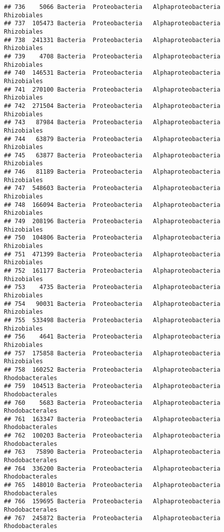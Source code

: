 \documentclass[
]{article}
\begin{document}
\begin{verbatim}
## 736    5066 Bacteria  Proteobacteria   Alphaproteobacteria         Rhizobiales
## 737  105473 Bacteria  Proteobacteria   Alphaproteobacteria         Rhizobiales
## 738  241331 Bacteria  Proteobacteria   Alphaproteobacteria         Rhizobiales
## 739    4708 Bacteria  Proteobacteria   Alphaproteobacteria         Rhizobiales
## 740  146531 Bacteria  Proteobacteria   Alphaproteobacteria         Rhizobiales
## 741  270100 Bacteria  Proteobacteria   Alphaproteobacteria         Rhizobiales
## 742  271504 Bacteria  Proteobacteria   Alphaproteobacteria         Rhizobiales
## 743   87984 Bacteria  Proteobacteria   Alphaproteobacteria         Rhizobiales
## 744   63879 Bacteria  Proteobacteria   Alphaproteobacteria         Rhizobiales
## 745   63877 Bacteria  Proteobacteria   Alphaproteobacteria         Rhizobiales
## 746   81189 Bacteria  Proteobacteria   Alphaproteobacteria         Rhizobiales
## 747  548603 Bacteria  Proteobacteria   Alphaproteobacteria         Rhizobiales
## 748  166094 Bacteria  Proteobacteria   Alphaproteobacteria         Rhizobiales
## 749  208196 Bacteria  Proteobacteria   Alphaproteobacteria         Rhizobiales
## 750  104806 Bacteria  Proteobacteria   Alphaproteobacteria         Rhizobiales
## 751  471399 Bacteria  Proteobacteria   Alphaproteobacteria         Rhizobiales
## 752  161177 Bacteria  Proteobacteria   Alphaproteobacteria         Rhizobiales
## 753    4735 Bacteria  Proteobacteria   Alphaproteobacteria         Rhizobiales
## 754   90031 Bacteria  Proteobacteria   Alphaproteobacteria         Rhizobiales
## 755  533498 Bacteria  Proteobacteria   Alphaproteobacteria         Rhizobiales
## 756    4641 Bacteria  Proteobacteria   Alphaproteobacteria         Rhizobiales
## 757  175858 Bacteria  Proteobacteria   Alphaproteobacteria         Rhizobiales
## 758  160252 Bacteria  Proteobacteria   Alphaproteobacteria     Rhodobacterales
## 759  104513 Bacteria  Proteobacteria   Alphaproteobacteria     Rhodobacterales
## 760    5683 Bacteria  Proteobacteria   Alphaproteobacteria     Rhodobacterales
## 761  163347 Bacteria  Proteobacteria   Alphaproteobacteria     Rhodobacterales
## 762  100203 Bacteria  Proteobacteria   Alphaproteobacteria     Rhodobacterales
## 763   75890 Bacteria  Proteobacteria   Alphaproteobacteria     Rhodobacterales
## 764  336200 Bacteria  Proteobacteria   Alphaproteobacteria     Rhodobacterales
## 765  148010 Bacteria  Proteobacteria   Alphaproteobacteria     Rhodobacterales
## 766  159695 Bacteria  Proteobacteria   Alphaproteobacteria     Rhodobacterales
## 767  245872 Bacteria  Proteobacteria   Alphaproteobacteria     Rhodobacterales

\end{verbatim}
\end{document}
